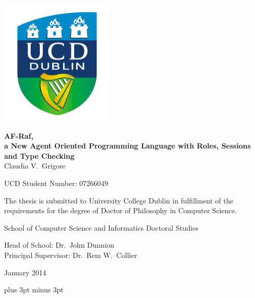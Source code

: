 \documentclass[a4paper,12pt,oneside,fleqn]{book} %
\begin{document}
\frontmatter


\begin{titlepage}
\begin{center}

\includegraphics{ucd2.png}

\bigskip\bigskip
{\huge\bf AF-Raf, \\
a New Agent Oriented Programming Language
with Roles, Sessions and Type Checking}
\\[3ex]
{\Large Claudia V.~Grigore}

UCD Student Number: 07266049

\bigskip\bigskip
The thesis is submitted to University College Dublin
in fulfillment of the requirements for the degree of
Doctor of Philosophy in Computer Science.

\bigskip
School of Computer Science and Informatics Doctoral Studies

\bigskip
Head of School: Dr.~John Dunnion\\
Principal Supervisor: Dr.~Rem W.~Collier\\
\bigskip

January 2014
\end{center}
\end{titlepage}


\tableofcontents
\listoffigures
\listoftables
\baselineskip=21.75pt
\parskip=3pt plus 3pt minus 3pt
%
\end{document}
